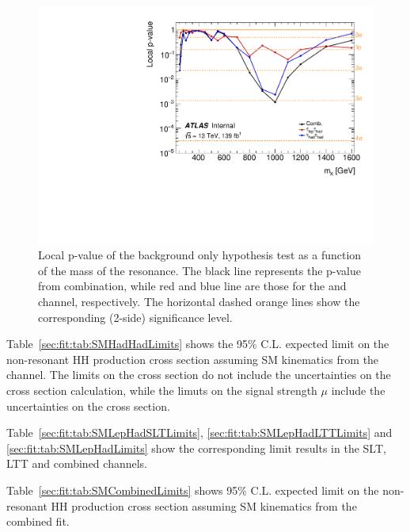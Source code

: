 \begin{figure}
   \centering
   \includegraphics[width=.8\textwidth]{figures/results/HH/Combined/CombObsPvalues_21072021.pdf}
   \caption{Local p-value of the background only hypothesis test as a function of the mass of the resonance. The black line represents the p-value from combination, while red and blue line are those for the \lephad and \hadhad channel, respectively. The horizontal dashed orange lines show the corresponding (2-side) significance level.}
   \label{fig:CombinedPValues}
\end{figure}


Table~\ref{sec:fit:tab:SMHadHadLimits} shows the 95\% C.L. expected limit on the non-resonant HH production cross section assuming SM kinematics from the \hadhad channel. The limits on the cross section do not include the uncertainties on the cross section calculation, while the limuts on the signal strength $\mu$ include the uncertainties on the cross section.

Table~\ref{sec:fit:tab:SMLepHadSLTLimits}, \ref{sec:fit:tab:SMLepHadLTTLimits} 
and \ref{sec:fit:tab:SMLepHadLimits} show the corresponding limit results in the \lephad SLT, LTT and combined channels.

Table~\ref{sec:fit:tab:SMCombinedLimits} shows 95\% C.L. expected limit on the non-resonant HH production cross section assuming SM kinematics from the combined fit.


